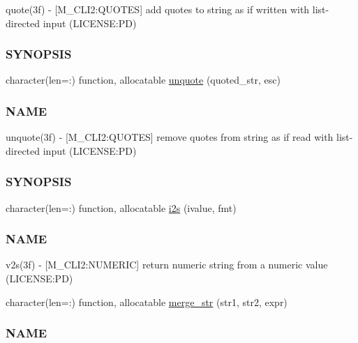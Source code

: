 \begin{DoxyCompactItemize}
\begin{DoxyCompactList}
quote(3f) -\/ \mbox{[}M\+\_\+\+C\+L\+I2\+:Q\+U\+O\+T\+ES\mbox{]} add quotes to string as if written with list-\/directed input (L\+I\+C\+E\+N\+SE\+:PD) \subsubsection*{S\+Y\+N\+O\+P\+S\+IS}\end{DoxyCompactList}\item 
character(len=\+:) function, allocatable \mbox{\hyperlink{namespacem__cli2_a9cab7352414f8b5625330a9ff5cf0cb4}{unquote}} (quoted\+\_\+str, esc)
\begin{DoxyCompactList}\small\item\em \subsubsection*{N\+A\+ME}

unquote(3f) -\/ \mbox{[}M\+\_\+\+C\+L\+I2\+:Q\+U\+O\+T\+ES\mbox{]} remove quotes from string as if read with list-\/directed input (L\+I\+C\+E\+N\+SE\+:PD) \subsubsection*{S\+Y\+N\+O\+P\+S\+IS}\end{DoxyCompactList}\item 
character(len=\+:) function, allocatable \mbox{\hyperlink{namespacem__cli2_aa106d3533fd6d4845f0b3e94b2a79ffb}{i2s}} (ivalue, fmt)
\begin{DoxyCompactList}\small\item\em \subsubsection*{N\+A\+ME}

v2s(3f) -\/ \mbox{[}M\+\_\+\+C\+L\+I2\+:N\+U\+M\+E\+R\+IC\mbox{]} return numeric string from a numeric value (L\+I\+C\+E\+N\+SE\+:PD) \end{DoxyCompactList}\item 
character(len=\+:) function, allocatable \mbox{\hyperlink{namespacem__cli2_a8e172feb2e4ae4d21d4fceb4e54f593c}{merge\+\_\+str}} (str1, str2, expr)
\begin{DoxyCompactList}\small\item\em \subsubsection*{N\+A\+ME}


\end{DoxyCompactList}
\end{DoxyCompactItemize}
